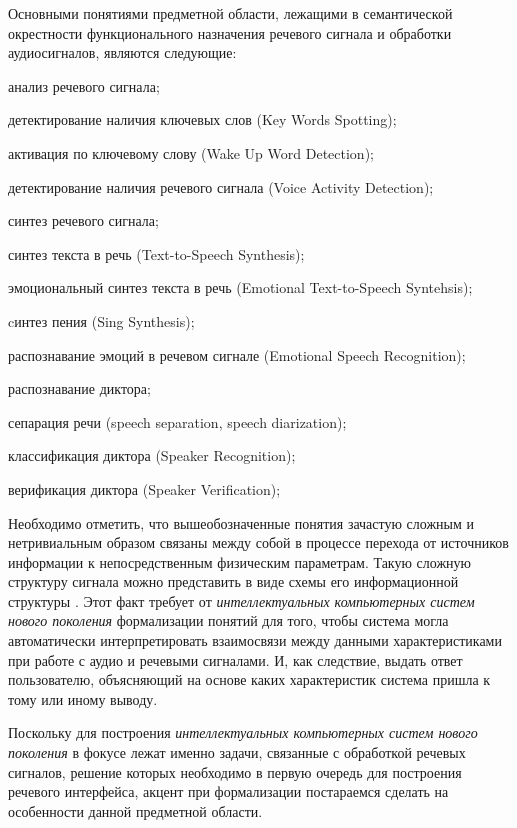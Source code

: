 Основными понятиями предметной области, лежащими в семантической окрестности функционального назначения речевого сигнала и обработки аудиосигналов, являются следующие:
\begin{textitemize}    
    \item анализ речевого сигнала;
    \item детектирование наличия ключевых слов (Key Words Spotting);
    \item активация по ключевому слову (Wake Up Word Detection);
    \item детектирование наличия речевого сигнала (Voice Activity Detection);
    \item синтез речевого сигнала;
    \item синтез текста в речь (Text-to-Speech Synthesis);
    \item эмоциональный синтез текста в речь (Emotional Text-to-Speech Syntehsis);
    \item cинтез пения (Sing Synthesis);
    \item распознавание эмоций в речевом сигнале (Emotional Speech Recognition);
    \item распознавание диктора;
    \item сепарация речи (speech separation, speech diarization);
    \item классификация диктора (Speaker Recognition);
    \item верификация диктора (Speaker Verification);
\end{textitemize}

Необходимо отметить, что вышеобозначенные понятия зачастую сложным и нетривиальным образом связаны между собой в процессе перехода от источников информации к непосредственным физическим параметрам. Такую сложную структуру сигнала можно представить в виде схемы его информационной структуры \textit{}. Этот факт требует от \textit{интеллектуальных компьютерных систем нового поколения} формализации понятий для того, чтобы система могла автоматически интерпретировать взаимосвязи между данными характеристиками при работе с аудио и речевыми сигналами. И, как следствие, выдать ответ пользователю, объясняющий на основе каких характеристик система пришла к тому или иному выводу. 

Поскольку для построения \textit{интеллектуальных компьютерных систем нового поколения} в фокусе лежат именно задачи, связанные с обработкой речевых сигналов, решение которых необходимо в первую очередь для построения речевого интерфейса, акцент при формализации постараемся сделать на особенности данной предметной области.


